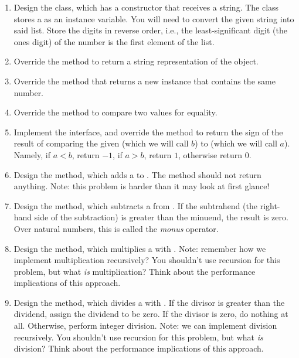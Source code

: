 \begin{enumerate}[label=(\alph*)]
    \item Design the  class, which has a constructor that receives a string. The  class stores a  as an instance variable. You will need to convert the given string into said list. Store the digits in reverse order, i.e., the least-significant digit (the ones digit) of the number is the first element of the list.
    \item Override the  method to return a string representation of the  object. 
    \item Override the  method that returns a new  instance that contains the same number.
    \item Override the  method to compare two  values for equality. 
    \item Implement the  interface, and override the  method to return the sign of the result of comparing the given  (which we will call $b$) to   (which we will call $a$). Namely, if $a < b$, return $-1$, if $a > b$, return $1$, otherwise return $0$.
    \item Design the  method, which adds a  to  . The method should not return anything. Note: this problem is harder than it may look at first glance!
    \item Design the  method, which subtracts a  from  . If the subtrahend (the right-hand side of the subtraction) is greater than the minuend, the result is zero. Over natural numbers, this is called the \emph{monus} operator.
    \item Design the  method, which multiplies a  with  . Note: remember how we implement multiplication recursively? You shouldn't use recursion for this problem, but what \emph{is} multiplication? Think about the performance implications of this approach.
    \item Design the  method, which divides a  with  . If the divisor is greater than the dividend, assign the dividend to be zero. If the divisor is zero, do nothing at all. Otherwise, perform integer division. Note: we can implement division recursively. You shouldn't use recursion for this problem, but what \emph{is} division? Think about the performance implications of this approach.
\end{enumerate}

